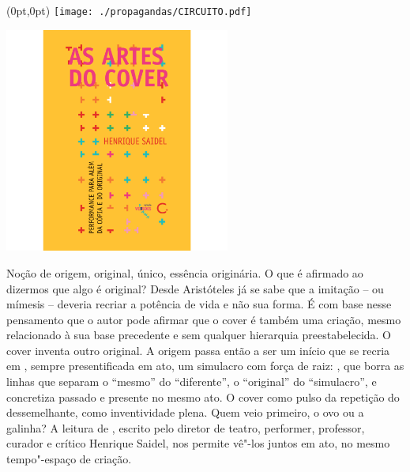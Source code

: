 \pagestyle{circuito}
\label{circuito}

\begin{textblock*}{5.625in}(0pt,0pt)%
\vspace*{-3.49cm}
\hspace*{-2.76cm}\texttt{[image: ./propagandas/CIRCUITO.pdf]}
\end{textblock*}

\pagebreak %


\begin{center}
\hspace*{-3.6cm}
\hspace*{3.1cm}\includegraphics[width=74mm]{./grid/cover.jpg}
\end{center}

\hspace*{-7cm}\hrulefill\hspace*{-7cm}

\medskip

\noindent{}Noção de origem, original, único, essência originária. O que é afirmado ao dizermos que algo é original? Desde Aristóteles já se sabe que a imitação – ou mímesis – deveria recriar a potência de vida e não sua forma. É com base nesse pensamento que o autor pode afirmar que o cover é também uma criação, mesmo relacionado à sua base precedente e sem qualquer hierarquia preestabelecida. O cover inventa outro original.
A origem passa então a ser um início que se recria em {}, sempre presentificada em ato, um simulacro com força de raiz: , que borra as linhas que separam o “mesmo” do “diferente”, o “original” do “simulacro”, e concretiza passado e presente no mesmo ato. O cover como pulso da repetição do dessemelhante, como inventividade plena. Quem veio primeiro, o ovo ou a galinha? A leitura de {}, escrito pelo diretor de teatro, performer, professor, curador e crítico Henrique Saidel, nos permite vê"-los juntos em ato, no mesmo tempo"-espaço de criação.

